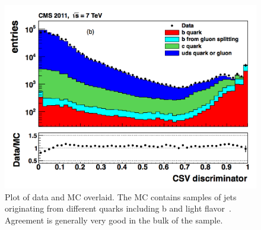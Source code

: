 	
\begin{figure}[h]
\begin{center}
\includegraphics[width=0.7\linewidth]{Figs/CSV_discriminator_values.png}
\end{center}
\caption{\label{fig:csv_discriminant_values}
Plot of data and MC overlaid. The MC contains samples of jets originating from different quarks including b and light flavor~\cite{btagging}. Agreement is generally very good in the bulk of the sample.
}
\end{figure}
	
	
	
	
	
	
	
	
	
	